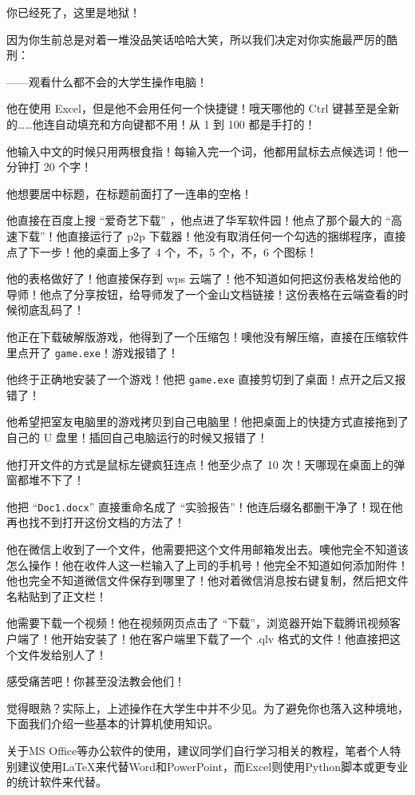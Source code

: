 你已经死了，这里是地狱！

因为你生前总是对着一堆没品笑话哈哈大笑，所以我们决定对你实施最严厉的酷刑：

——观看什么都不会的大学生操作电脑！

他在使用 Excel，但是他不会用任何一个快捷键！哦天哪他的 Ctrl 键甚至是全新的……他连自动填充和方向键都不用！从 1 到 100 都是手打的！

他输入中文的时候只用两根食指！每输入完一个词，他都用鼠标去点候选词！他一分钟打 20 个字！

他想要居中标题，在标题前面打了一连串的空格！

他直接在百度上搜 “爱奇艺下载” ，他点进了华军软件园！他点了那个最大的 “高速下载”！他直接运行了 p2p 下载器！他没有取消任何一个勾选的捆绑程序，直接点了下一步！他的桌面上多了 4 个，不，5 个，不，6 个图标！

他的表格做好了！他直接保存到 wps 云端了！他不知道如何把这份表格发给他的导师！他点了分享按钮，给导师发了一个金山文档链接！这份表格在云端查看的时候彻底乱码了！

他正在下载破解版游戏，他得到了一个压缩包！噢他没有解压缩，直接在压缩软件里点开了 \texttt{game.exe}！游戏报错了！

他终于正确地安装了一个游戏！他把 \texttt{game.exe} 直接剪切到了桌面！点开之后又报错了！

他希望把室友电脑里的游戏拷贝到自己电脑里！他把桌面上的快捷方式直接拖到了自己的 U 盘里！插回自己电脑运行的时候又报错了！

他打开文件的方式是鼠标左键疯狂连点！他至少点了 10 次！天哪现在桌面上的弹窗都堆不下了！

他把 “\texttt{Doc1.docx}” 直接重命名成了 “实验报告”！他连后缀名都删干净了！现在他再也找不到打开这份文档的方法了！

他在微信上收到了一个文件，他需要把这个文件用邮箱发出去。噢他完全不知道该怎么操作！他在收件人这一栏输入了上司的手机号！他完全不知道如何添加附件！他也完全不知道微信文件保存到哪里了！他对着微信消息按右键复制，然后把文件名粘贴到了正文栏！

他需要下载一个视频！他在视频网页点击了 “下载”，浏览器开始下载腾讯视频客户端了！他开始安装了！他在客户端里下载了一个 .qlv 格式的文件！他直接把这个文件发给别人了！

感受痛苦吧！你甚至没法教会他们！

觉得眼熟？实际上，上述操作在大学生中并不少见。为了避免你也落入这种境地，下面我们介绍一些基本的计算机使用知识。

关于MS Office等办公软件的使用，建议同学们自行学习相关的教程，笔者个人特别建议使用LaTeX来代替Word和PowerPoint，而Excel则使用Python脚本或更专业的统计软件来代替。

